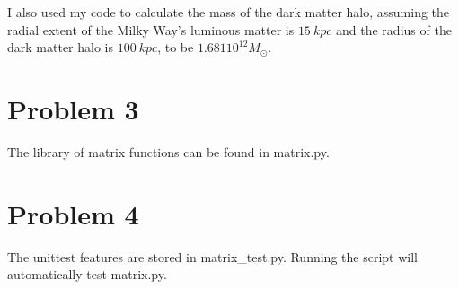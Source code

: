 \documentclass[12pt, letterpaper]{article}
\begin{document}
I also used my code to calculate the mass of the dark matter halo, assuming the radial extent of the Milky Way's luminous matter is $15 \ kpc$ and the radius of the dark matter halo is $100 \ kpc$, to be $1.681 10^{12} M_\odot$. 

\section*{Problem 3}

The library of matrix functions can be found in {matrix.py}.

\section*{Problem 4}
The unittest features are stored in matrix\_test.py. Running the script will automatically test matrix.py.
\end{document}

